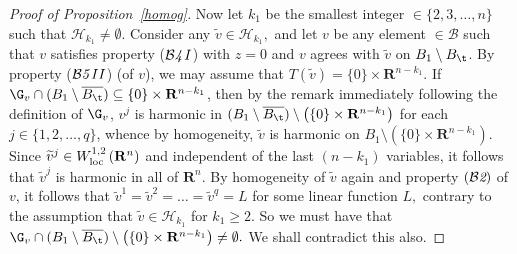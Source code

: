 \documentclass[a4paper,11pt]{amsart}
\begin{document}
\begin{proof}[Proof of Proposition~\ref{homog}]
Now let $k_{1}$ be the smallest integer $\in \{2, 3, \ldots, n\}$ such that ${\mathcal  H}_{k_{1}} \neq \emptyset.$
Consider any $\widetilde{v} \in {\mathcal H}_{k_{1}},$ and let $v$ be any element $\in {\mathcal B}$ such that $v$ satisfies property (${\mathcal B}{\emph 4 \, I}$) with $z = 0$ and $v$ agrees with $\widetilde{v}$ on $B_{1} \setminus B_{\t}$. By property (${\mathcal B{\emph 5 \, II}}$) (of $v$), we may assume that $T(\widetilde{v}) = \{0\} \times {\mathbf R}^{n-k_{1}}.$ If $\G_{v} \cap (B_{1} \setminus \overline{B_{\t}}) \subseteq \{0\} \times {\mathbf R}^{n-k_{1}}$, then by the remark immediately following the definition of $\G_{v}$, $v^{j}$ is harmonic in $(B_{1} \setminus \overline{B_{\t}}) \setminus \left(\{0\} \times {\mathbf R}^{n-k_{1}}\right)$ for each $j \in \{1, 2, \ldots, q\}$, whence by homogeneity, $\widetilde{v}$ is harmonic on $B_{1} \setminus \left(\{0\} \times {\mathbf R}^{n-k_{1}}\right).$ Since $\widetilde{v}^{j} \in W^{1, 2}_{\rm loc} \, ({\mathbf R}^{n})$ and independent of the last $(n-k_{1})$ variables, it follows that $\widetilde{v}^{j}$ is harmonic in all of ${\mathbf R}^{n}.$ By homogeneity of $\widetilde{v}$ again and property $({\mathcal B{\emph 2}})$ of $v$, it follows that $\widetilde{v}^{1} = \widetilde{v}^{2} = \ldots = \widetilde{v}^{q} = L$ for some linear function $L,$  contrary to the assumption that $\widetilde{v} \in {\mathcal H}_{k_{1}}$ for $k_{1} \geq 2$. So we must have that $\G_{v} \cap (B_{1} \setminus \overline{B_{\t}}) \setminus \left(\{0\} \times {\mathbf R}^{n-k_{1}}\right) \neq \emptyset.$ We shall contradict this also. 


\end{proof}
\end{document}
